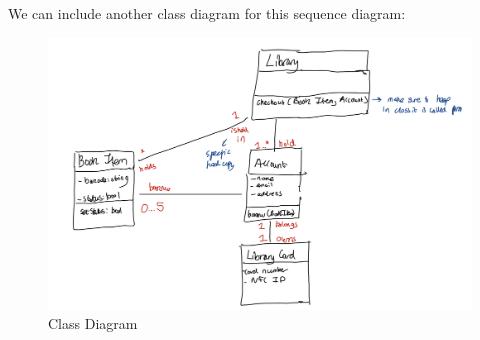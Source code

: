 \documentclass{article}
\begin{document}
We can include another class diagram for this sequence diagram:
\begin{figure}[H]
    \centering
    \includegraphics[width = 0.7\linewidth]{Pictures/Screenshot 2023-02-01 at 12.00.26.png}
    \caption{Class Diagram}    
\end{figure}
\end{document}
